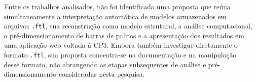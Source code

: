 \begin{quadro}[htb]
    \centering
    \caption{Comparação entre os trabalhos relacionados}
    \label{qua:comparacao-trabalhos}
    \small
\end{quadro}

Entre os trabalhos analisados, não foi identificada uma proposta que reúna simultaneamente a interpretação automática de modelos armazenados em arquivos \texttt{.ftl}, sua reconstrução como modelo estrutural, a análise computacional, o pré-dimensionamento de barras de palitos e a apresentação dos resultados em uma aplicação web voltada à \acrshort{CP3}. Embora  também investigue diretamente o formato \texttt{.ftl}, sua proposta concentra-se na documentação e na manipulação desse formato, não abrangendo as etapas subsequentes de análise e pré-dimensionamento consideradas nesta pesquisa.